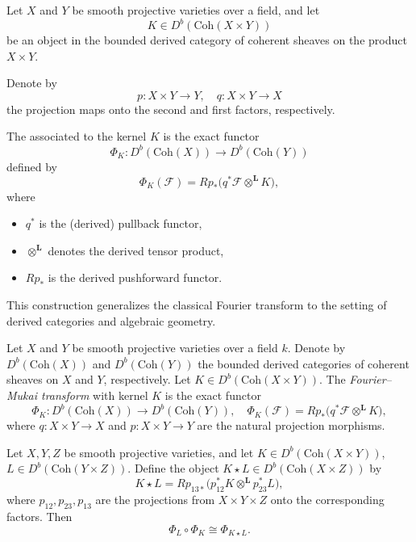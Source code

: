 \begin{definition}
Let \(X\) and \(Y\) be smooth projective varieties over a field, and let 
\[
K \in D^b(\mathrm{Coh}(X \times Y))
\]
be an object in the bounded derived category of coherent sheaves on the product \(X \times Y\).

Denote by 
\[
p : X \times Y \to Y, \quad q : X \times Y \to X
\]
the projection maps onto the second and first factors, respectively.

The  associated to the kernel \(K\) is the exact functor
\[
\Phi_K : D^b(\mathrm{Coh}(X)) \to D^b(\mathrm{Coh}(Y))
\]
defined by
\[
\Phi_K(\mathcal{F}) = R p_*\bigl( q^* \mathcal{F} \otimes^{\mathbf{L}} K \bigr),
\]
where 
\begin{itemize}
  \item \(q^*\) is the (derived) pullback functor,
  \item \(\otimes^{\mathbf{L}}\) denotes the derived tensor product,
  \item \(R p_*\) is the derived pushforward functor.
\end{itemize}

This construction generalizes the classical Fourier transform to the setting of derived categories and algebraic geometry.

\end{definition}

\begin{definition}
Let $X$ and $Y$ be smooth projective varieties over a field $k$. Denote by $D^b(\mathrm{Coh}(X))$ and $D^b(\mathrm{Coh}(Y))$ the bounded derived categories of coherent sheaves on $X$ and $Y$, respectively. Let $K \in D^b(\mathrm{Coh}(X \times Y))$. The \emph{Fourier--Mukai transform} with kernel $K$ is the exact functor
$$
\Phi_K : D^b(\mathrm{Coh}(X)) \to D^b(\mathrm{Coh}(Y)), \quad \Phi_K(\mathcal{F}) = Rp_*\big(q^*\mathcal{F} \otimes^{\mathbf{L}} K \big),
$$
where $q: X \times Y \to X$ and $p: X \times Y \to Y$ are the natural projection morphisms.
\end{definition}

\begin{proposition}
Let $X, Y, Z$ be smooth projective varieties, and let $K \in D^b(\mathrm{Coh}(X \times Y))$, $L \in D^b(\mathrm{Coh}(Y \times Z))$. Define the object $K \star L \in D^b(\mathrm{Coh}(X \times Z))$ by
$$
K \star L = Rp_{13*}\bigl( p_{12}^* K \otimes^{\mathbf{L}} p_{23}^* L \bigr),
$$
where $p_{12}, p_{23}, p_{13}$ are the projections from $X \times Y \times Z$ onto the corresponding factors. Then
$$
\Phi_L \circ \Phi_K \cong \Phi_{K \star L}.
$$
\end{proposition}

